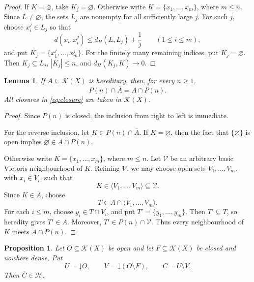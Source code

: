 \documentclass[11pt]{amsart}
\newtheorem{proposition}[theorem]{Proposition}
\newtheorem{lemma}[theorem]{Lemma}
\theoremstyle{remark}
\newcommand{\K}{\mathcal K}
\newcommand{\HH}{\mathcal H}
\newcommand{\cl}[1]{\overline{#1}}
\newcommand{\down}[1]{\mathord{\downarrow}\!#1}
\begin{document}
\begin{proof}
If $K=\varnothing$, take $K_j=\varnothing$. Otherwise write
$K=\{x_1,\ldots,x_m\}$, where $m\leq n$. Since $L\neq\varnothing$,
the sets $L_j$ are nonempty for all sufficiently large $j$. For such
$j$, choose $x_i^j\in L_j$ so that
\[
d(x_i,x_i^j)\leq d_H(L,L_j)+\frac1j
\qquad (1\leq i\leq m),
\]
and put $K_j=\{x_1^j,\ldots,x_m^j\}$. For the finitely many remaining
indices, put $K_j=\varnothing$. Then $K_j\subseteq L_j$,
$|K_j|\leq n$, and $d_H(K_j,K)\to0$.
\end{proof}

\begin{lemma}\label{lem:closure}
If $A\subseteq\K(X)$ is hereditary, then, for every $n\geq1$,
\begin{equation}\label{eq:closure}
P(n)\cap\cl A=\cl{A\cap P(n)}.
\end{equation}
All closures in \eqref{eq:closure} are taken in $\K(X)$.
\end{lemma}

\begin{proof}
Since $P(n)$ is closed, the inclusion from right to left is immediate.

For the reverse inclusion, let $K\in P(n)\cap\cl A$. If $K=\varnothing$,
then the fact that $\{\varnothing\}$ is open implies
$\varnothing\in A\cap P(n)$.

Otherwise write $K=\{x_1,\ldots,x_m\}$, where $m\leq n$. Let
$\mathcal V$ be an arbitrary basic Vietoris neighbourhood of $K$.
Refining $\mathcal V$, we may choose open sets $V_1,\ldots,V_m$, with
$x_i\in V_i$, such that
\[
K\in\langle V_1,\ldots,V_m\rangle\subseteq\mathcal V.
\]
Since $K\in\cl A$, choose
\[
T\in A\cap\langle V_1,\ldots,V_m\rangle.
\]
For each $i\leq m$, choose $y_i\in T\cap V_i$, and put
$T'=\{y_1,\ldots,y_m\}$. Then $T'\subseteq T$, so heredity gives
$T'\in A$. Moreover, $T'\in P(n)\cap\mathcal V$. Thus every
neighbourhood of $K$ meets $A\cap P(n)$.
\end{proof}


\begin{proposition}\label{prop:local}
Let $O\subseteq\K(X)$ be open and let $F\subseteq\K(X)$ be closed and
nowhere dense. Put
\[
U=\down O,\qquad
V=\down(O\setminus F),\qquad
C=U\setminus V.
\]
Then $\cl C\in\HH$.
\end{proposition}
\end{document}
